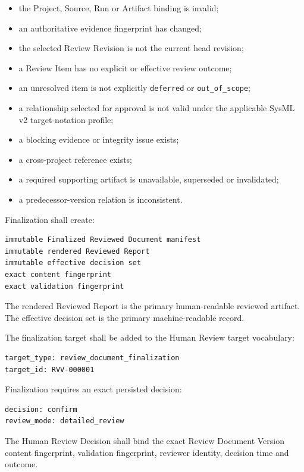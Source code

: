 \begin{itemize}
\tightlist
\item
  the Project, Source, Run or Artifact binding is invalid;
\item
  an authoritative evidence fingerprint has changed;
\item
  the selected Review Revision is not the current head revision;
\item
  a Review Item has no explicit or effective review outcome;
\item
  an unresolved item is not explicitly \texttt{deferred} or \texttt{out\_of\_scope};
\item
  a relationship selected for approval is not valid under the applicable SysML v2 target-notation profile;
\item
  a blocking evidence or integrity issue exists;
\item
  a cross-project reference exists;
\item
  a required supporting artifact is unavailable, superseded or invalidated;
\item
  a predecessor-version relation is inconsistent.
\end{itemize}

Finalization shall create:

\begin{verbatim}
immutable Finalized Reviewed Document manifest
immutable rendered Reviewed Report
immutable effective decision set
exact content fingerprint
exact validation fingerprint
\end{verbatim}

The rendered Reviewed Report is the primary human-readable reviewed artifact. The effective decision set is the primary machine-readable record.

The finalization target shall be added to the Human Review target vocabulary:

\begin{verbatim}
target_type: review_document_finalization
target_id: RVV-000001
\end{verbatim}

Finalization requires an exact persisted decision:

\begin{verbatim}
decision: confirm
review_mode: detailed_review
\end{verbatim}

The Human Review Decision shall bind the exact Review Document Version content fingerprint, validation fingerprint, reviewer identity, decision time and outcome.

